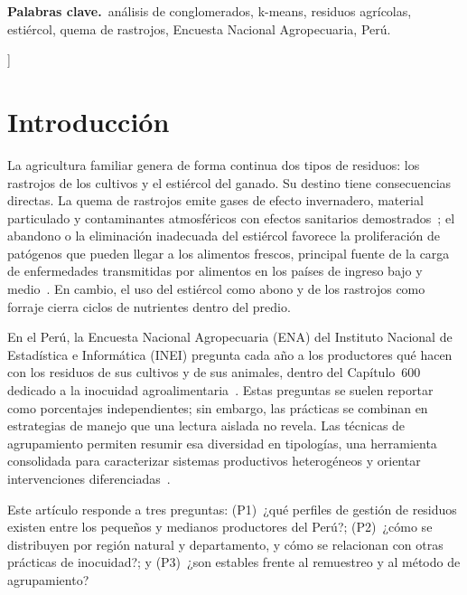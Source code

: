 \documentclass[10pt,twocolumn,a4paper]{article}
\begin{document}
{\begin{tcolorbox}[enhanced,colback=WLight,colframe=WLight,boxrule=0pt,
  borderline west={2.5pt}{0pt}{WBlue},arc=0pt,left=4mm,right=4mm,top=2.5mm,bottom=2.5mm]
\vspace{1.5mm}
{\sffamily\bfseries\color{WBlue}Palabras clave.}\ análisis de conglomerados, k-means, residuos agrícolas, estiércol, quema de rastrojos, Encuesta Nacional Agropecuaria, Perú.
\end{tcolorbox}
\vspace{4mm}
}]
\thispagestyle{first}

\section{Introducción}
La agricultura familiar genera de forma continua dos tipos de residuos: los rastrojos de los cultivos y el estiércol del ganado. Su destino tiene consecuencias directas. La quema de rastrojos emite gases de efecto invernadero, material particulado y contaminantes atmosféricos con efectos sanitarios demostrados~\cite{jain2014}; el abandono o la eliminación inadecuada del estiércol favorece la proliferación de patógenos que pueden llegar a los alimentos frescos, principal fuente de la carga de enfermedades transmitidas por alimentos en los países de ingreso bajo y medio~\cite{grace2015}. En cambio, el uso del estiércol como abono y de los rastrojos como forraje cierra ciclos de nutrientes dentro del predio.

En el Perú, la Encuesta Nacional Agropecuaria (ENA) del Instituto Nacional de Estadística e Informática (INEI) pregunta cada año a los productores qué hacen con los residuos de sus cultivos y de sus animales, dentro del Capítulo~600 dedicado a la inocuidad agroalimentaria~\cite{inei_ena,inei_ena2023}. Estas preguntas se suelen reportar como porcentajes independientes; sin embargo, las prácticas se combinan en estrategias de manejo que una lectura aislada no revela. Las técnicas de agrupamiento permiten resumir esa diversidad en tipologías, una herramienta consolidada para caracterizar sistemas productivos heterogéneos y orientar intervenciones diferenciadas~\cite{alvarez2018}.

Este artículo responde a tres preguntas: (P1)~¿qué perfiles de gestión de residuos existen entre los pequeños y medianos productores del Perú?; (P2)~¿cómo se distribuyen por región natural y departamento, y cómo se relacionan con otras prácticas de inocuidad?; y (P3)~¿son estables frente al remuestreo y al método de agrupamiento?

\end{document}
